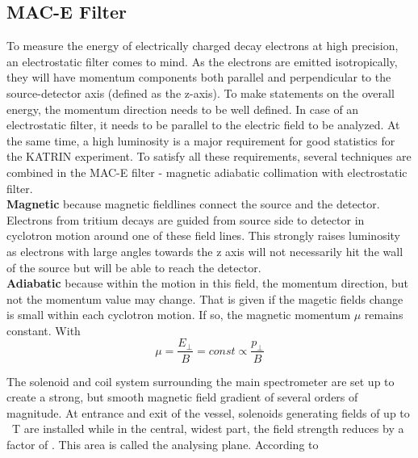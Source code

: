        \subsection{MAC-E Filter}
      \label{ch:The KATRIN experiment:sec:MAC-E}
		To measure the energy of electrically charged decay electrons at high precision, an electrostatic filter comes to mind. As the electrons are emitted isotropically, they will have momentum components both parallel and perpendicular to the source-detector axis (defined as the z-axis). To make statements on the overall energy, the momentum direction needs to be well defined. In case of an electrostatic filter, it needs to be parallel to the electric field to be analyzed.
		At the same time, a high luminosity is a major requirement for good statistics for the KATRIN experiment.
		To satisfy all these requirements, several techniques are combined in the MAC-E filter - magnetic adiabatic collimation with electrostatic filter.\\
		{\bf Magnetic} because magnetic fieldlines connect the source and the detector. Electrons from tritium decays are guided from source side to detector in cyclotron motion around one of these field lines. This strongly raises luminosity as electrons with large angles towards the z axis will not necessarily hit the wall of the source but will be able to reach the detector.\\
		{\bf Adiabatic} because within the motion in this field, the momentum direction, but not the momentum value may change. That is given if the magetic fields change is small within each cyclotron motion. If so, the magnetic momentum $\mu$ remains constant. With
		\begin{equation}
			\mu = \frac{E_{\bot}}{B} = const \propto \frac{p_\bot}{B}
		\end{equation}
		
		
		The solenoid and coil system surrounding the main spectrometer are set up to create a strong, but smooth magnetic field gradient of several orders of magnitude. At entrance and exit of the vessel, solenoids generating fields of up to \SI{}{\tesla} are installed while in the central, widest part, the field strength reduces by a factor of . This area is called the analysing plane. According to
      

